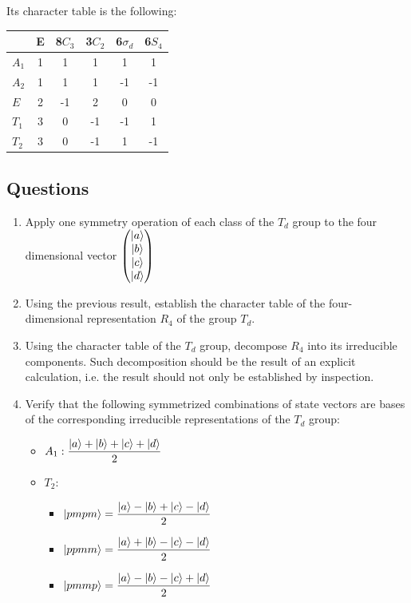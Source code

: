Its character table is the following:

\begin{center}
 \begin{tabular}{|| l | *{5}{c} ||} 
 \hline
   & E & 8$C_3$ & 3$C_2$ & 6$\sigma_d$ & 6$S_4$ \\ [0.5ex] 
 \hline\hline
 $A_1$ & 1 & 1 & 1 & 1 & 1 \\ 
 \hline
 $A_2$ & 1 & 1 & 1 & -1 & -1 \\ 
 \hline
 $E$ & 2 & -1 & 2 & 0 & 0 \\ 
 \hline
 $T_1$ & 3 & 0 & -1 & -1 & 1 \\ 
 \hline
 $T_2$ & 3 & 0 & -1 & 1 & -1 \\
 \hline
\end{tabular}
\end{center}

\subsection{Questions}

\begin{enumerate}[label=(\roman*)]
\item Apply one symmetry operation of each class of the $T_d$ group to
  the four dimensional vector $\begin{pmatrix}
\left| a \right>\\ 
\left| b \right>\\
\left| c \right>\\
\left| d \right>\\
\end{pmatrix}$
\item Using the previous result, establish the character table of the
  four-dimensional representation $R_4$ of the group $T_d$.
\item Using the character
  table of the $T_d$ group, decompose $R_4$ into its irreducible
  components. Such decomposition should be the result of an explicit
  calculation, i.e. the result should not only be established by inspection.
\item Verify that the following symmetrized combinations of state
  vectors are bases of the corresponding irreducible representations
  of the $T_d$ group:
  \begin {itemize}
  \item $A_1: \dfrac{\left| a \right> + \left| b \right> + \left| c \right> + \left| d \right>}{2}$
  \item $T_2: $ \begin{itemize}
    \item $\left| pmpm \right> = \dfrac{\left| a \right> - \left| b \right> + \left| c \right> -
        \left| d \right>}{2}$
    \item $\left| ppmm \right> = \dfrac{\left| a \right> + \left| b \right> - \left| c \right> -
        \left| d \right>}{2}$
    \item $\left| pmmp \right> = \dfrac{\left| a \right> - \left| b \right> - \left| c \right> +
        \left| d \right>}{2}$
    \end{itemize}
  \end{itemize}
\end{enumerate}




